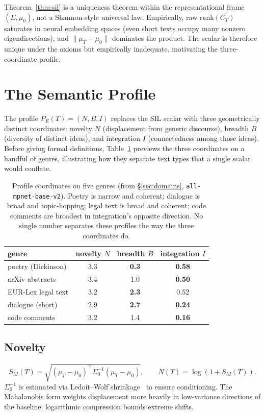 \documentclass[11pt]{article}
\begin{document}
Theorem~\ref{thm:sil} is a uniqueness theorem within the representational frame $(E, \mu_0)$, not a Shannon-style universal law. Empirically, raw $\mathrm{rank}(C_T)$ saturates in neural embedding spaces (even short texts occupy many nonzero eigendirections), and $\|\mu_T - \mu_0\|$ dominates the product. The scalar is therefore unique under the axioms but empirically inadequate, motivating the three-coordinate profile.

\section{The Semantic Profile}\label{sec:profile}

The profile $P_E(T) = (N, B, I)$ replaces the SIL scalar with three geometrically distinct coordinates: novelty $N$ (displacement from generic discourse), breadth $B$ (diversity of distinct ideas), and integration $I$ (connectedness among those ideas). Before giving formal definitions, Table~\ref{tab:genre-preview} previews the three coordinates on a handful of genres, illustrating how they separate text types that a single scalar would conflate.

\begin{table}[h]
\centering
\begin{tabular}{lccc}
\toprule
genre & novelty $N$ & breadth $B$ & integration $I$ \\
\midrule
poetry (Dickinson)     & 3.3 & \textbf{0.3} & \textbf{0.58} \\
arXiv abstracts        & 3.4 & 1.0          & \textbf{0.50} \\
EUR-Lex legal text     & 3.2 & \textbf{2.3} & 0.52 \\
dialogue (short)       & 2.9 & \textbf{2.7} & \textbf{0.24} \\
code comments          & 3.2 & 1.4          & \textbf{0.16} \\
\bottomrule
\end{tabular}
\caption{Profile coordinates on five genres (from \S\ref{sec:domains}, \texttt{all-mpnet-base-v2}). Poetry is narrow and coherent; dialogue is broad and topic-hopping; legal text is broad and coherent; code comments are broadest in integration's opposite direction. No single number separates these profiles the way the three coordinates do.}\label{tab:genre-preview}
\end{table}

\subsection{Novelty}
\[
S_M(T) = \sqrt{(\mu_T - \mu_0)^\top \Sigma_0^{-1} (\mu_T - \mu_0)},
\qquad
N(T) = \log(1 + S_M(T)).
\]
$\Sigma_0^{-1}$ is estimated via Ledoit--Wolf shrinkage~\cite{ledoit2004} to ensure conditioning. The Mahalanobis form weights displacement more heavily in low-variance directions of the baseline; logarithmic compression bounds extreme shifts.
\end{document}

